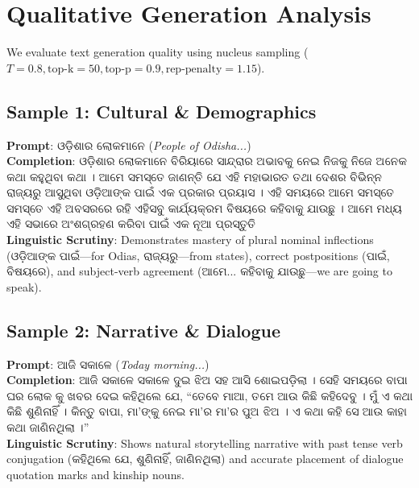 \documentclass[10pt,twocolumn,letterpaper]{article}
\newcommand{\odia}[1]{{\odiafont #1}}
\newcommand{\odia}[1]{\textit{#1}}
\begin{document}
\section{Qualitative Generation Analysis}

We evaluate text generation quality using nucleus sampling ($T=0.8, \text{top-k}=50, \text{top-p}=0.9, \text{rep-penalty}=1.15$).

\subsection{Sample 1: Cultural \& Demographics}
\noindent\textbf{Prompt}: \odia{ଓଡ଼ିଶାର ଲୋକମାନେ} (\textit{People of Odisha...})\\
\noindent\textbf{Completion}: \odia{ଓଡ଼ିଶାର ଲୋକମାନେ ବିରିୟାରେ ସାନ୍ଦ୍ରାର ଅଭାବକୁ ନେଇ ନିଜକୁ ନିଜେ ଅନେକ କଥା କହୁଥିବା କଥା । ଆମେ ସମସ୍ତେ ଜାଣନ୍ତି ଯେ ଏହି ମହାଭାରତ ତଥା ଦେଶର ବିଭିନ୍ନ ରାଜ୍ୟରୁ ଆସୁଥିବା ଓଡ଼ିଆଙ୍କ ପାଇଁ ଏକ ପ୍ରକାର ପ୍ରୟାସ । ଏହି ସମୟରେ ଆମେ ସମସ୍ତେ ସମସ୍ତେ ଏହି ଅବସରରେ ରହି ଏହିସବୁ କାର୍ଯ୍ୟକ୍ରମ ବିଷୟରେ କହିବାକୁ ଯାଉଛୁ । ଆମେ ମଧ୍ୟ ଏହି ସଭାରେ ଅଂଶଗ୍ରହଣ କରିବା ପାଇଁ ଏକ ନୂଆ ପ୍ରସ୍ତୁତି}\\
\noindent\textbf{Linguistic Scrutiny}: Demonstrates mastery of plural nominal inflections (\odia{ଓଡ଼ିଆଙ୍କ ପାଇଁ}---for Odias, \odia{ରାଜ୍ୟରୁ}---from states), correct postpositions (\odia{ପାଇଁ}, \odia{ବିଷୟରେ}), and subject-verb agreement (\odia{ଆମେ... କହିବାକୁ ଯାଉଛୁ}---we are going to speak).

\subsection{Sample 2: Narrative \& Dialogue}
\noindent\textbf{Prompt}: \odia{ଆଜି ସକାଳେ} (\textit{Today morning...})\\
\noindent\textbf{Completion}: \odia{ଆଜି ସକାଳେ ସକାଳେ ଦୁଇ ଝିଅ ସହ ଆସି ଶୋଇପଡ଼ିଲା । ସେହି ସମୟରେ ବାପା ଘର ଲୋକ କୁ ଖବର ଦେଇ କହିଥିଲେ ଯେ, ``ତେବେ ମାଆ, ତମେ ଆଉ କିଛି କହିଦେବୁ । ମୁଁ ଏ କଥା କିଛି ଶୁଣିନାହିଁ । କିନ୍ତୁ ବାପା, ମା'ଙ୍କୁ ନେଇ ମା'ର ମା'ର ପୁଅ ଝିଅ । ଏ କଥା କହି ସେ ଆଉ କାହା କଥା ଜାଣିନଥିଲା ।''}\\
\noindent\textbf{Linguistic Scrutiny}: Shows natural storytelling narrative with past tense verb conjugation (\odia{କହିଥିଲେ ଯେ}, \odia{ଶୁଣିନାହିଁ}, \odia{ଜାଣିନଥିଲା}) and accurate placement of dialogue quotation marks and kinship nouns.
\end{document}
